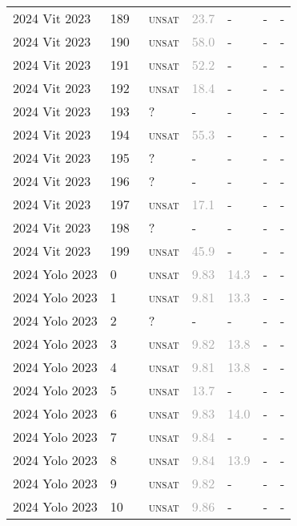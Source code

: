 \begin{center}
{\begin{longtable}{@{}lllllll@{}}
2024 Vit 2023 & 189 & ~\textsc{unsat} & \textcolor{darkgray}{23.7} & - & - & - \\
2024 Vit 2023 & 190 & ~\textsc{unsat} & \textcolor{darkgray}{58.0} & - & - & - \\
2024 Vit 2023 & 191 & ~\textsc{unsat} & \textcolor{darkgray}{52.2} & - & - & - \\
2024 Vit 2023 & 192 & ~\textsc{unsat} & \textcolor{darkgray}{18.4} & - & - & - \\
2024 Vit 2023 & 193 & ~? & - & - & - & - \\
2024 Vit 2023 & 194 & ~\textsc{unsat} & \textcolor{darkgray}{55.3} & - & - & - \\
2024 Vit 2023 & 195 & ~? & - & - & - & - \\
2024 Vit 2023 & 196 & ~? & - & - & - & - \\
2024 Vit 2023 & 197 & ~\textsc{unsat} & \textcolor{darkgray}{17.1} & - & - & - \\
2024 Vit 2023 & 198 & ~? & - & - & - & - \\
2024 Vit 2023 & 199 & ~\textsc{unsat} & \textcolor{darkgray}{45.9} & - & - & - \\
\midrule
2024 Yolo 2023 & 0 & ~\textsc{unsat} & \textcolor{darkgray}{9.83} & \textcolor{darkgray}{14.3} & - & - \\
2024 Yolo 2023 & 1 & ~\textsc{unsat} & \textcolor{darkgray}{9.81} & \textcolor{darkgray}{13.3} & - & - \\
2024 Yolo 2023 & 2 & ~? & - & - & - & - \\
2024 Yolo 2023 & 3 & ~\textsc{unsat} & \textcolor{darkgray}{9.82} & \textcolor{darkgray}{13.8} & - & - \\
2024 Yolo 2023 & 4 & ~\textsc{unsat} & \textcolor{darkgray}{9.81} & \textcolor{darkgray}{13.8} & - & - \\
2024 Yolo 2023 & 5 & ~\textsc{unsat} & \textcolor{darkgray}{13.7} & - & - & - \\
2024 Yolo 2023 & 6 & ~\textsc{unsat} & \textcolor{darkgray}{9.83} & \textcolor{darkgray}{14.0} & - & - \\
2024 Yolo 2023 & 7 & ~\textsc{unsat} & \textcolor{darkgray}{9.84} & - & - & - \\
2024 Yolo 2023 & 8 & ~\textsc{unsat} & \textcolor{darkgray}{9.84} & \textcolor{darkgray}{13.9} & - & - \\
2024 Yolo 2023 & 9 & ~\textsc{unsat} & \textcolor{darkgray}{9.82} & - & - & - \\
2024 Yolo 2023 & 10 & ~\textsc{unsat} & \textcolor{darkgray}{9.86} & - & - & - \\

\end{longtable}}
\end{center}
